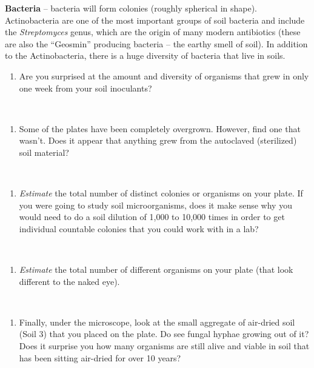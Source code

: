 \documentclass[
  letterpaper,
  twocolumn,
  portrait]{scrbook}
\providecommand{\tightlist}{%
  \setlength{\itemsep}{0pt}\setlength{\parskip}{0pt}}\usepackage{longtable,booktabs,array}
\begin{document}
\textbf{Bacteria} -- bacteria will form colonies (roughly spherical in
shape). Actinobacteria are one of the most important groups of soil
bacteria and include the \emph{Streptomyces} genus, which are the origin
of many modern antibiotics (these are also the ``Geosmin'' producing
bacteria -- the earthy smell of soil). In addition to the
Actinobacteria, there is a huge diversity of bacteria that live in
soils.

\begin{enumerate}
\def\labelenumi{\arabic{enumi}.}
\tightlist
\item
  Are you surprised at the amount and diversity of organisms that grew
  in only one week from your soil inoculants?
\end{enumerate}

~ ~ ~

\begin{enumerate}
\def\labelenumi{\arabic{enumi}.}
\setcounter{enumi}{1}
\tightlist
\item
  Some of the plates have been completely overgrown. However, find one
  that wasn't. Does it appear that anything grew from the autoclaved
  (sterilized) soil material?
\end{enumerate}

~ ~ ~

\begin{enumerate}
\def\labelenumi{\arabic{enumi}.}
\setcounter{enumi}{2}
\tightlist
\item
  \emph{Estimate} the total number of distinct colonies or organisms on
  your plate. If you were going to study soil microorganisms, does it
  make sense why you would need to do a soil dilution of 1,000 to 10,000
  times in order to get individual countable colonies that you could
  work with in a lab?
\end{enumerate}

~ ~ ~

\begin{enumerate}
\def\labelenumi{\arabic{enumi}.}
\setcounter{enumi}{3}
\tightlist
\item
  \emph{Estimate} the total number of different organisms on your plate
  (that look different to the naked eye).
\end{enumerate}

~ ~ ~

\begin{enumerate}
\def\labelenumi{\arabic{enumi}.}
\setcounter{enumi}{4}
\tightlist
\item
  Finally, under the microscope, look at the small aggregate of
  air-dried soil (Soil 3) that you placed on the plate. Do see fungal
  hyphae growing out of it? Does it surprise you how many organisms are
  still alive and viable in soil that has been sitting air-dried for
  over 10 years?
\end{enumerate}
\end{document}
